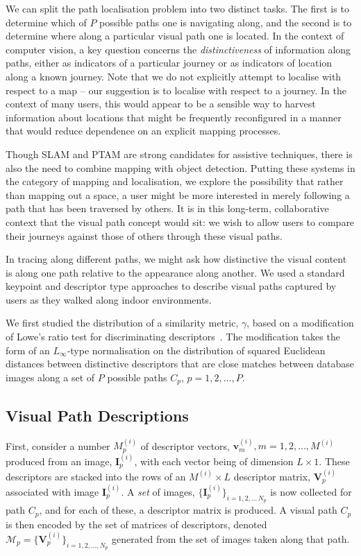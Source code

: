 We can split the path localisation problem into two distinct tasks.  The first is to determine which of $P$ possible paths one is navigating along, and the second is to determine where along a particular visual path one is located.  In the context of computer vision, a key question concerns the {\it distinctiveness} of information along paths, either as indicators of a particular journey or as indicators of location along a known journey.  Note that we do not explicitly attempt to localise with respect to a map -- our suggestion is to localise with respect to a journey.  In the context of many users, this would appear to be a sensible way to harvest information about locations that might be frequently reconfigured in a manner that would reduce dependence on an explicit mapping processes.

Though SLAM and PTAM are strong candidates for assistive techniques, there is also the need to combine mapping with object detection.  Putting these systems in the category of mapping and localisation, we explore the possibility that rather than mapping out a space, a user might be more interested in merely following a path that has been traversed by others.  It is in this long-term, collaborative context that the visual path concept would sit: we wish to allow users to compare their journeys against those of others through these visual paths.

In tracing along different paths, we might ask how distinctive the visual content is along one path relative to the appearance along another. We used a standard keypoint and descriptor type approaches to describe visual paths captured by users as they walked along indoor environments.

We first studied the distribution of a similarity metric, $\gamma$, based on a modification of Lowe's ratio test for discriminating descriptors~\cite{Lowe2004}. The modification takes the form of an $L_{\infty}$-type normalisation on the distribution of squared Euclidean distances between distinctive descriptors that are close matches between database images along a set of $P$ possible paths $C_p,\,p=1,2,\ldots, P$.

\subsection{Visual Path Descriptions} First, consider a number $M_p^{(i)}$ of descriptor vectors, $\mathbf{v}_m^{(i)}, m=1,2,\ldots,M^{(i)}$ produced from an image, $\mathbf{I}^{(i)}_p$, with each vector being of  dimension $L \times 1$.  These descriptors are stacked into the rows of an $M^{(i)}\times L$ descriptor matrix, $\mathbf{V}^{(i)}_p$ associated with image $\mathbf{I}^{(i)}_p$.  A {\it set} of images, $\lbrace \mathbf{I}^{(i)}_p\rbrace_{i=1,2,\ldots\,N_p}$ is now collected for path $C_p$, and for each of these, a descriptor matrix is produced.  A visual path $C_p$ is then encoded by the set of matrices of descriptors, denoted $\mathcal{M}_p=\lbrace \mathbf{V}^{(i)}_p \rbrace_{i=1,2,\ldots,N_p}$ generated from the set of images taken along that path.
 
